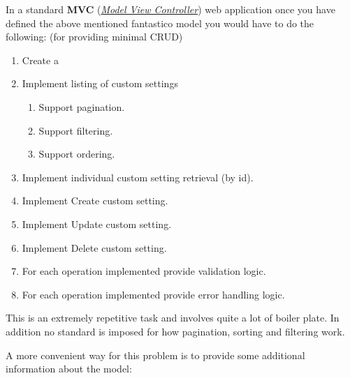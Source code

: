\documentclass[letterpaper,10pt,english]{sphinxmanual}
\begin{document}
In a standard \textbf{MVC} ({\hyperref[features/mvc::doc]{\emph{Model View Controller}}}) web application once you have defined the above mentioned fantastico model you would
have to do the following: (for providing minimal CRUD)
\begin{enumerate}
\item {} 
Create a {\hyperref[features/mvc:fantastico.mvc.controller_decorators.Controller]{}}

\item {} 
Implement listing of custom settings
\begin{enumerate}
\item {} 
Support pagination.

\item {} 
Support filtering.

\item {} 
Support ordering.

\end{enumerate}

\item {} 
Implement individual custom setting retrieval (by id).

\item {} 
Implement Create custom setting.

\item {} 
Implement Update custom setting.

\item {} 
Implement Delete custom setting.

\item {} 
For each operation implemented provide validation logic.

\item {} 
For each operation implemented provide error handling logic.

\end{enumerate}

This is an extremely repetitive task and involves quite a lot of boiler plate. In addition no standard is imposed for how
pagination, sorting and filtering work.

A more convenient way for this problem is to provide some additional information about the model:
\end{document}
